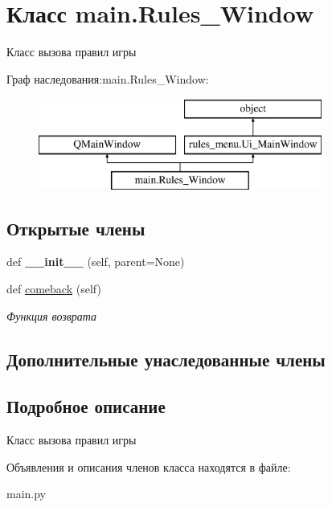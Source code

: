 \hypertarget{classmain_1_1_rules___window}{}\section{Класс main.\+Rules\+\_\+\+Window}
\label{classmain_1_1_rules___window}


Класс вызова правил игры  


Граф наследования\+:main.\+Rules\+\_\+\+Window\+:\begin{figure}[H]
\begin{center}
\leavevmode
\includegraphics[height=3.000000cm]{classmain_1_1_rules___window}
\end{center}
\end{figure}
\subsection*{Открытые члены}
\begin{DoxyCompactItemize}
\item 
\mbox{\label{classmain_1_1_rules___window_ac82e3902daff69490a53ca4a3bb4f4a3}} 
def {\bfseries \+\_\+\+\_\+init\+\_\+\+\_\+} (self, parent=None)
\item 
\mbox{\label{classmain_1_1_rules___window_ac5d70963fc438bcbadd0f85edac848ba}} 
def \mbox{\hyperlink{classmain_1_1_rules___window_ac5d70963fc438bcbadd0f85edac848ba}{comeback}} (self)
\begin{DoxyCompactList}\small\item\em Функция возврата \end{DoxyCompactList}\end{DoxyCompactItemize}
\subsection*{Дополнительные унаследованные члены}


\subsection{Подробное описание}
Класс вызова правил игры 

Объявления и описания членов класса находятся в файле\+:\begin{DoxyCompactItemize}
\item 
main.\+py\end{DoxyCompactItemize}

